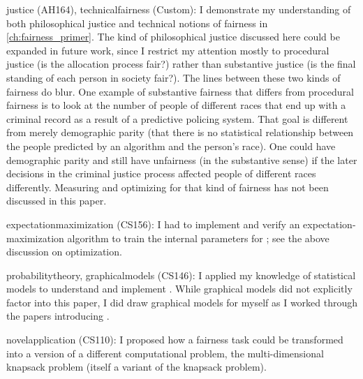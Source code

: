 \begin{itemize}
\hashtag justice (AH164), technicalfairness (Custom): I demonstrate my understanding of both philosophical justice and technical notions of fairness in \autoref{ch:fairness_primer}. The kind of philosophical justice discussed here could be expanded in future work, since I restrict my attention mostly to procedural justice (is the allocation process fair?) rather than substantive justice (is the final standing of each person in society fair?). The lines between these two kinds of fairness do blur. One example of substantive fairness that differs from procedural fairness is to look at the number of people of different races that end up with a criminal record as a result of a predictive policing system. That goal is different from merely demographic parity (that there is no statistical relationship between the people predicted by an algorithm and the person's race). One could have demographic parity and still have unfairness (in the substantive sense) if the later decisions in the criminal justice process affected people of different races differently. Measuring and optimizing for that kind of fairness has not been discussed in this paper.

\hashtag expectationmaximization (CS156): I had to implement and verify an expectation-maximization algorithm to train the internal parameters for \pp; see the above discussion on optimization.

\hashtag probabilitytheory, graphicalmodels (CS146): I applied my knowledge of statistical models to understand and implement \pp. While graphical models did not explicitly factor into this paper, I did draw graphical models for myself as I worked through the papers introducing \pp.


\hashtag novelapplication (CS110): I proposed how a fairness task could be transformed into a version of a different computational problem, the multi-dimensional knapsack problem (itself a variant of the knapsack problem).
\end{itemize}
